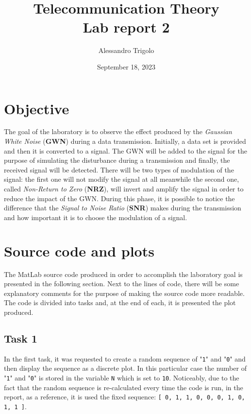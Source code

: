 \title{\vspace{160px} \textbf{\huge{Telecommunication Theory}} \\\vspace{17.5px} \LARGE{Lab report 2}  \vspace{10px}}
\author{Alessandro Trigolo}
\date{September 18, 2023}


\maketitle \newpage


\section*{Objective}\label{objective}
The goal of the laboratory is to observe the effect produced by the \textit{Gaussian White Noise} (\textbf{GWN}) during a data transmission. Initially, a data set is provided and then it is converted to a signal. The GWN will be added to the signal for the purpose of simulating the disturbance during a transmission and finally, the received signal will be detected. There will be two types of modulation of the signal: the first one will not modify the signal at all meanwhile the second one, called \textit{Non-Return to Zero} (\textbf{NRZ}), will invert and amplify the signal in order to reduce the impact of the GWN. During this phase, it is possible to notice the difference that the \textit{Signal to Noise Ratio} (\textbf{SNR}) makes during the transmission and how important it is to choose the modulation of a signal.

% 
% 
\section*{Source code and plots} \label{source_code_plots}
The MatLab source code produced in order to accomplish the laboratory goal is presented in the following section. Next to the lines of code, there will be some explanatory comments for the purpose of making the source code more readable. The code is divided into tasks and, at the end of each, it is presented the plot produced.

\lstset{style = MatLab}

\subsection*{Task 1}
In the first task, it was requested to create a random sequence of "\texttt{1}" and "\texttt{0}" and then display the sequence as a discrete plot. In this particular case the number of "\texttt{1}" and "\texttt{0}" is stored in the variable \texttt{N} which is set to \texttt{10}. Noticeably, due to the fact that the random sequence is re-calculated every time the code is run, in the report, as a reference, it is used the fixed sequence: \texttt{[ 0, 1, 1, 0, 0, 0, 1, 0, 1, 1 ]}.

